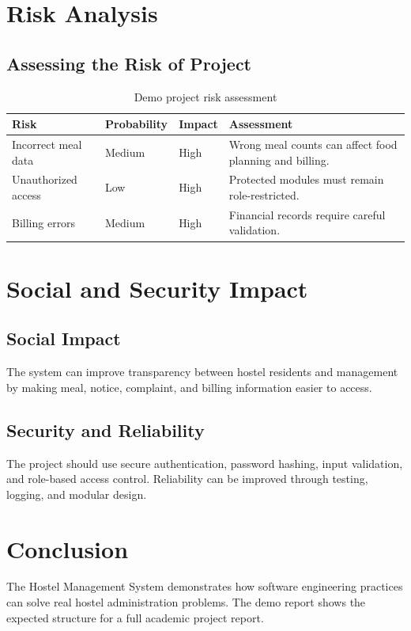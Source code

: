 \documentclass[12pt,a4paper]{report}
\begin{document}
\chapter{Risk Analysis}
\section{Assessing the Risk of Project}
\begin{table}[H]
\centering
\begin{tabularx}{\textwidth}{|p{3.2cm}|C{2.2cm}|C{2cm}|Y|}
\hline
{}
\textbf{Risk} & \textbf{Probability} & \textbf{Impact} & \textbf{Assessment} \\
\hline
Incorrect meal data & Medium & High & Wrong meal counts can affect food planning and billing. \\
\hline
Unauthorized access & Low & High & Protected modules must remain role-restricted. \\
\hline
Billing errors & Medium & High & Financial records require careful validation. \\
\hline
\end{tabularx}
\caption{Demo project risk assessment}
\end{table}

\chapter{Social and Security Impact}
\section{Social Impact}
The system can improve transparency between hostel residents and management by making meal, notice, complaint, and billing information easier to access.

\section{Security and Reliability}
The project should use secure authentication, password hashing, input validation, and role-based access control. Reliability can be improved through testing, logging, and modular design.

\chapter{Conclusion}
The Hostel Management System demonstrates how software engineering practices can solve real hostel administration problems. The demo report shows the expected structure for a full academic project report.
\end{document}
